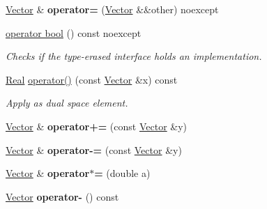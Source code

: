 \begin{DoxyCompactItemize}
\item 
\hyperlink{classSpacy_1_1Vector}{Vector} \& {\bfseries operator=} (\hyperlink{classSpacy_1_1Vector}{Vector} \&\&other) noexcept\hypertarget{classSpacy_1_1Vector_ac33a668c8906a994166727b241082309}{}\label{classSpacy_1_1Vector_ac33a668c8906a994166727b241082309}

\item 
\hyperlink{classSpacy_1_1Vector_a3285df21a258aaf9d35dd3981ff0aa74}{operator bool} () const noexcept
\begin{DoxyCompactList}\small\item\em Checks if the type-\/erased interface holds an implementation. \end{DoxyCompactList}\item 
\hyperlink{classSpacy_1_1Real}{Real} \hyperlink{classSpacy_1_1Vector_af6f1ec896b05538a931e72dbecdebbb1}{operator()} (const \hyperlink{classSpacy_1_1Vector}{Vector} \&x) const \hypertarget{classSpacy_1_1Vector_af6f1ec896b05538a931e72dbecdebbb1}{}\label{classSpacy_1_1Vector_af6f1ec896b05538a931e72dbecdebbb1}

\begin{DoxyCompactList}\small\item\em Apply as dual space element. \end{DoxyCompactList}\item 
\hyperlink{classSpacy_1_1Vector}{Vector} \& {\bfseries operator+=} (const \hyperlink{classSpacy_1_1Vector}{Vector} \&y)\hypertarget{classSpacy_1_1Vector_a6d5770a3bd58db532e79b16f2526c275}{}\label{classSpacy_1_1Vector_a6d5770a3bd58db532e79b16f2526c275}

\item 
\hyperlink{classSpacy_1_1Vector}{Vector} \& {\bfseries operator-\/=} (const \hyperlink{classSpacy_1_1Vector}{Vector} \&y)\hypertarget{classSpacy_1_1Vector_afbebc56400ed2e281815fee88b78b3f6}{}\label{classSpacy_1_1Vector_afbebc56400ed2e281815fee88b78b3f6}

\item 
\hyperlink{classSpacy_1_1Vector}{Vector} \& {\bfseries operator$\ast$=} (double a)\hypertarget{classSpacy_1_1Vector_a06a3538f752f001b289c2f690357e1e7}{}\label{classSpacy_1_1Vector_a06a3538f752f001b289c2f690357e1e7}

\item 
\hyperlink{classSpacy_1_1Vector}{Vector} {\bfseries operator-\/} () const \hypertarget{classSpacy_1_1Vector_a050dba43b304fdf5f15141d25465be56}{}\label{classSpacy_1_1Vector_a050dba43b304fdf5f15141d25465be56}


\end{DoxyCompactItemize}
